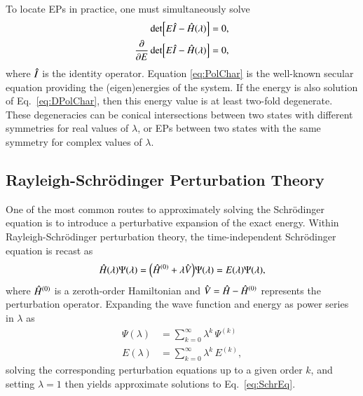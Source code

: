 \documentclass[aps,prb,reprint,noshowkeys,superscriptaddress]{revtex4-1}
\newcommand{\hI}{\Hat{I}}
\newcommand{\hH}{\Hat{H}}
\newcommand{\hV}{\Hat{V}}
\begin{document}
To locate EPs in practice, one must simultaneously solve
\begin{subequations}
\begin{align}
	\label{eq:PolChar}
	\det[E\hI-\hH(\lambda)] & = 0,
	\\ 
	\label{eq:DPolChar}
	\pdv{E}\det[E\hI-\hH(\lambda)] & = 0,
\end{align}
\end{subequations}
where $\hI$ is the identity operator.\cite{Cejnar_2007}
Equation \eqref{eq:PolChar} is the well-known secular equation providing the (eigen)energies of the system. 
If the energy is also solution of Eq.~\eqref{eq:DPolChar}, then this energy value is at least two-fold degenerate. 
These degeneracies can be conical intersections between two states with different symmetries 
for real values of $\lambda$,\cite{Yarkony_1996} or EPs between two states with the 
same symmetry for complex values of $\lambda$.


\subsection{Rayleigh-Schr\"odinger Perturbation Theory}

One of the most common routes to approximately solving the Schr\"odinger equation
is to introduce a perturbative expansion of the exact energy.
Within Rayleigh-Schr\"odinger perturbation theory, the time-independent Schr\"odinger equation 
is recast as 
\begin{equation} 
	\hH(\lambda) \Psi(\lambda) 
    = \qty(\hH^{(0)} + \lambda \hV ) \Psi(\lambda) 
    = E(\lambda) \Psi(\lambda),
    \label{eq:SchrEq-PT}
\end{equation}
where $\hH^{(0)}$ is a zeroth-order Hamiltonian and $\hV = \hH - \hH^{(0)}$ represents the perturbation operator.
Expanding the wave function and energy as power series in $\lambda$ as 
\begin{subequations}
\begin{align}
    \Psi(\lambda) &= \sum_{k=0}^{\infty} \lambda^{k}\,\Psi^{(k)} 
    \label{eq:psi_expansion}
    \\
    E(\lambda) &= \sum_{k=0}^{\infty} \lambda^{k}\,E^{(k)},
    \label{eq:E_expansion}
\end{align}
\end{subequations}
solving the corresponding perturbation equations up to a given order $k$, and
setting $\lambda = 1$ then yields approximate solutions to Eq.~\eqref{eq:SchrEq}.
\end{document}
